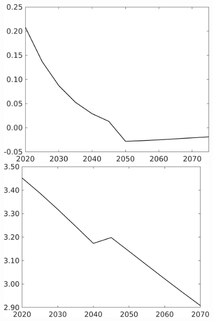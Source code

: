 \documentclass[12pt]{article}
\begin{document}
\begin{figure}[h!!]
\begin{minipage}[]{0.32\textwidth}
	\end{minipage}
	\begin{minipage}[]{0.32\textwidth}
		\includegraphics[width=1\textwidth]{../../codding_model/own_basedOnFried/optimalPol_010922_revision/figures/all_13Sept22/CompTaufPER_bytaul_Equlab_Reg0_sn_spillover0_nsk0_xgr0_knspil1_sep1_LFlimit1_emsbase0_countec0_GovRev0_etaa0.79_lgd0.png}
	\end{minipage}		
	\begin{minipage}[]{0.32\textwidth}
		\includegraphics[width=1\textwidth]{../../codding_model/own_basedOnFried/optimalPol_010922_revision/figures/all_13Sept22/CompTaufPER_bytaul_Equlab_Reg0_gAf_spillover0_nsk0_xgr0_knspil1_sep1_LFlimit1_emsbase0_countec0_GovRev0_etaa0.79_lgd0.png}

\end{minipage}
\end{figure}
\end{document}
